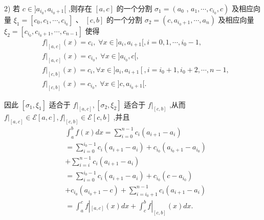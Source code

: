 2) 若 $c \in  \rbrack {a}_{{i}_{0}},{a}_{{i}_{0} + 1}\lbrack$ ,则存在 $\left\lbrack  {a,c}\right\rbrack$ 的一个分割 ${\sigma }_{1} = \left( {a}_{0}\right.$ , $\left. {{a}_{1},\cdots ,{c}_{{i}_{0}},c}\right)$ 及相应向量 ${\xi }_{1} = \left\lbrack  {{c}_{0},{c}_{1},\cdots ,{c}_{{i}_{0}}}\right\rbrack  \text{ 、 }\left\lbrack  {c,b}\right\rbrack$ 的一个分割 ${\sigma }_{2} = \left( {c,{a}_{{i}_{0} + 1},\cdots ,{a}_{n}}\right)$ 及相应向量 ${\xi }_{2} = \left\lbrack  {{c}_{{i}_{0}},{c}_{{i}_{0} + 1},\cdots ,{c}_{n - 1}}\right\rbrack$ 使得
\begin{align*}
	&{\left. f\right| }_{\left\lbrack  a,c\right\rbrack  }\left( x\right)  = {c}_{i},\;\forall x \in  \rbrack {a}_{i},{a}_{i + 1}\lbrack ,i = 0,1,\cdots ,{i}_{0} - 1,\\
	&{\left. f\right| }_{\left\lbrack  a,c\right\rbrack  }\left( x\right)  = {c}_{{i}_{0}},\;\forall x \in  \rbrack {a}_{{i}_{0}},c\lbrack ,\\
	&{\left. f\right| }_{\left\lbrack  c,b\right\rbrack  }\left( x\right)  = {c}_{i},\forall x \in  \rbrack {a}_{i},{a}_{i + 1}\left\lbrack  {,i = {i}_{0} + 1,{i}_{0} + 2,\cdots ,n - 1,}\right.\\
	&{\left. f\right| }_{\left\lbrack  c,b\right\rbrack  }\left( x\right)  = {c}_{{i}_{0}},\;\forall x \in  \rbrack c,{a}_{{i}_{0} + 1}\lbrack .
\end{align*}

因此 $\left\lbrack  {{\sigma }_{1},{\xi }_{1}}\right\rbrack$ 适合于 ${\left. f\right| }_{\left\lbrack  a,c\right\rbrack  },\left\lbrack  {{\sigma }_{2},{\xi }_{2}}\right\rbrack$ 适合于 ${\left. f\right| }_{\left\lbrack  c,b\right\rbrack  }$ ,从而 ${\left. f\right| }_{\left\lbrack  a,c\right\rbrack  } \in  \mathcal{E}\left\lbrack  {a,c}\right\rbrack  ,{\left. f\right| }_{\left\lbrack  c,b\right\rbrack  } \in  \mathcal{E}\left\lbrack  {c,b}\right\rbrack$ ,并且
\begin{align*}
	&{\int }_{a}^{b}f\left( x\right) {dx} = \mathop{\sum }\limits_{{i = 0}}^{{n - 1}}{c}_{i}\left( {{a}_{i + 1} - {a}_{i}}\right)\\
	&= \mathop{\sum }\limits_{{i = 0}}^{{{i}_{0} - 1}}{c}_{i}\left( {{a}_{i + 1} - {a}_{i}}\right)  + {c}_{{i}_{0}}\left( {{a}_{{i}_{0} + 1} - {a}_{{i}_{0}}}\right)\\
	&+ \mathop{\sum }\limits_{{i = i}}^{{n - 1}}{c}_{i}\left( {{a}_{i + 1} - {a}_{i}}\right)\\
	&= \mathop{\sum }\limits_{{i = 0}}^{{{i}_{0} - 1}}{c}_{i}\left( {{a}_{i + 1} - {a}_{i}}\right)  + {c}_{{i}_{0}}\left( {c - {a}_{{i}_{0}}}\right)\\
	&+ {c}_{{i}_{0}}\left( {{a}_{{i}_{0} + 1} - c}\right)  + \mathop{\sum }\limits_{{i = {i}_{0} + 1}}^{{n - 1}}{c}_{i}\left( {{a}_{i + 1} - {a}_{i}}\right)\\
	&= {\int }_{a}^{c}f{\left| {}_{\left\lbrack  a,c\right\rbrack  }\left( x\right) dx + {\int }_{c}^{b}f\right| }_{\left\lbrack  c,b\right\rbrack  }\left( x\right) {dx}.
\end{align*}

